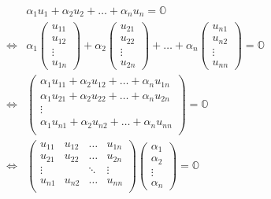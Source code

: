\begin{align*}
    & \alpha_1 u_1 + \alpha_2 u_2 + \ldots + \alpha_n u_n = \mathbb{O} \\[0.5em]
    \iff & \alpha_1 \begin{pmatrix}
                  u_{11} \\
                  u_{12} \\
                  \vdots   \\
                  u_{1n}
            \end{pmatrix} + \alpha_2 \begin{pmatrix}
                  u_{21} \\
                  u_{22} \\
                  \vdots   \\
                  u_{2n}
            \end{pmatrix} + \dots + \alpha_n \begin{pmatrix}
                  u_{n1} \\
                  u_{n2} \\
                  \vdots   \\
                  u_{nn}
            \end{pmatrix} = \mathbb{O} \\[0.5em]
    \iff & \begin{pmatrix}
        \alpha_1 u_{11} + \alpha_2 u_{12} + \ldots + \alpha_n u_{1n} \\
        \alpha_1 u_{21} + \alpha_2 u_{22} + \ldots + \alpha_n u_{2n} \\
        \vdots \\
        \alpha_1 u_{n1} + \alpha_2 u_{n2} + \ldots + \alpha_n u_{nn} \\
    \end{pmatrix} = \mathbb{O} \\[0.5em]
     \iff & \begin{pmatrix}
        u_{11} & u_{12} & \ldots & u_{1n} \\
        u_{21} & u_{22} & \ldots & u_{2n} \\
        \vdots & & \ddots & \vdots\\
        u_{n1} & u_{n2} & \ldots & u_{nn} \\
    \end{pmatrix} \begin{pmatrix}
        \alpha_1 \\
        \alpha_2 \\
        \vdots \\
        \alpha_n
    \end{pmatrix} = \mathbb{O}
\end{align*}
